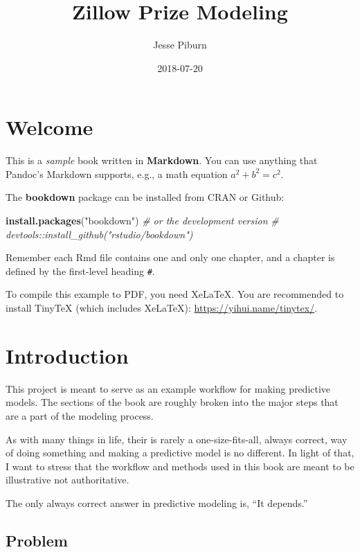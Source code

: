 \documentclass[]{book}
\title{Zillow Prize Modeling}
\author{Jesse Piburn}
\date{2018-07-20}
\newenvironment{Shaded}{\begin{snugshade}}{\end{snugshade}}
\newcommand{\KeywordTok}[1]{\textcolor[rgb]{0.13,0.29,0.53}{\textbf{#1}}}
\newcommand{\StringTok}[1]{\textcolor[rgb]{0.31,0.60,0.02}{#1}}
\newcommand{\CommentTok}[1]{\textcolor[rgb]{0.56,0.35,0.01}{\textit{#1}}}
\newcommand{\NormalTok}[1]{#1}
\theoremstyle{definition}
\theoremstyle{definition}
\theoremstyle{definition}
\theoremstyle{remark}
\begin{document}
\maketitle

{
\setcounter{tocdepth}{1}
\tableofcontents
}
\chapter*{Welcome}\label{welcome}

This is a \emph{sample} book written in \textbf{Markdown}. You can use
anything that Pandoc's Markdown supports, e.g., a math equation
\(a^2 + b^2 = c^2\).

The \textbf{bookdown} package can be installed from CRAN or Github:

\begin{Shaded}
\begin{Highlighting}[]
\KeywordTok{install.packages}\NormalTok{(}\StringTok{"bookdown"}\NormalTok{)}
\CommentTok{# or the development version}
\CommentTok{# devtools::install_github("rstudio/bookdown")}
\end{Highlighting}
\end{Shaded}

Remember each Rmd file contains one and only one chapter, and a chapter
is defined by the first-level heading \texttt{\#}.

To compile this example to PDF, you need XeLaTeX. You are recommended to
install TinyTeX (which includes XeLaTeX):
\url{https://yihui.name/tinytex/}.

\chapter{Introduction}\label{intro}

This project is meant to serve as an example workflow for making
predictive models. The sections of the book are roughly broken into the
major steps that are a part of the modeling process.

As with many things in life, their is rarely a one-size-fits-all, always
correct, way of doing something and making a predictive model is no
different. In light of that, I want to stress that the workflow and
methods used in this book are meant to be illustrative not
authoritative.

The only always correct answer in predictive modeling is, ``It
depends.''

\section{Problem}\label{problem}
\end{document}
